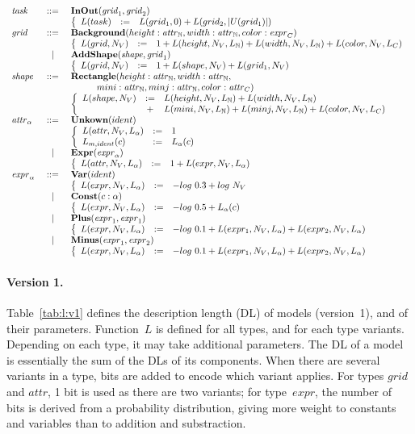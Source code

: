 \documentclass[a4paper]{llncs}
\newenvironment{datatype}{$\begin{array}{lcl}}{\end{array}$}
\newcommand{\is}{&\ ::=\ &}
\newcommand{\altis}{\\ &\ \mid\ &}
\newcommand{\baction}{\\ & & \left\{\begin{array}{lcl}}
\newcommand{\eaction}{\end{array}\right.}
\newcommand{\defby}{& := &}
\newcommand{\nat}{\mathbb{N}}
\begin{document}

\begin{table}[t]
\caption{Definition of the description length of models and their parameters}
\begin{center}
\begin{datatype}
  {\it task} \is {\bf InOut}({\it grid}_1, {\it grid}_2)
  \baction
  L(task) \defby L(grid_1,0) + L(grid_2,|U(grid_1)|)
  \eaction
  \\
  {\it grid} \is {\bf Background}(height: {\it attr}_\nat, width: {\it attr}_\nat, color: {\it expr}_C)
  \baction
  L(grid,N_V) \defby 1 + L(height,N_V,L_\nat) + L(width,N_V,L_\nat) + L(color,N_V,L_C)
  \eaction
  \altis {\bf AddShape}({\it shape}, {\it grid}_1)
  \baction
  L(grid,N_V) \defby 1 + L(shape,N_V) + L(grid_1,N_V)
  \eaction
  \\
  {\it shape} \is {\bf Rectangle}(height: {\it attr}_\nat, width: {\it attr}_\nat,\\
  & & \hspace*{1cm} mini: {\it attr}_\nat, minj: {\it attr}_\nat, color: {\it attr}_C)
  \baction
  L(shape,N_V) \defby L(height,N_V,L_\nat) + L(width,N_V,L_\nat) \\
  & + & L(mini,N_V,L_\nat) + L(minj,N_V,L_\nat) + L(color,N_V,L_C)
  \eaction
  \\
  {\it attr}_\alpha \is {\bf Unkown}(ident)
  \baction
  L(attr,N_V,L_\alpha) \defby 1 \\
  L_{m,ident}(c) \defby L_\alpha(c)
  \eaction
  \altis {\bf Expr}({\it expr}_\alpha)
  \baction
  L(attr,N_V,L_\alpha) \defby 1 + L(expr,N_V,L_\alpha)
  \eaction
  \\
  {\it expr}_\alpha \is {\bf Var}(ident)
  \baction
  L(expr,N_V,L_\alpha) \defby -log\ 0.3 + log\ N_V
  \eaction
  \altis {\bf Const}(c: \alpha)
  \baction
  L(expr,N_V,L_\alpha) \defby -log\ 0.5 + L_\alpha(c)
  \eaction
  \altis {\bf Plus}({\it expr}_1, {\it expr}_1)
  \baction
  L(expr,N_V,L_\alpha) \defby -log\ 0.1 + L(expr_1,N_V,L_\alpha) + L(expr_2,N_V,L_\alpha)
  \eaction
  \altis {\bf Minus}({\it expr}_1, {\it expr}_2)
  \baction
  L(expr,N_V,L_\alpha) \defby -log\ 0.1 + L(expr_1,N_V,L_\alpha) + L(expr_2,N_V,L_\alpha)
  \eaction
\end{datatype}
\end{center}
\label{tab:l:v1}
\end{table}

\paragraph{Version 1.} Table~\ref{tab:l:v1} defines the description
length (DL) of models (version~1), and of their
parameters. Function~$L$ is defined for all types, and for each type
variants. Depending on each type, it may take additional
parameters. The DL of a model is essentially the sum of the DLs of its
components. When there are several variants in a type, bits are added
to encode which variant applies. For types $grid$ and $attr$, 1 bit is
used as there are two variants; for type~$expr$, the number of bits is
derived from a probability distribution, giving more weight to
constants and variables than to addition and substraction.
\end{document}
